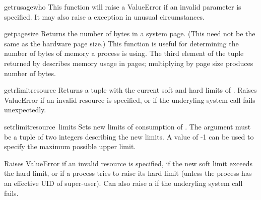 \begin{funcdesc}{getrusage}{who}
  This function will raise a ValueError if an invalid 
  parameter is specified. It may also raise a 
  exception in unusual circumstances.
\end{funcdesc}

\begin{funcdesc}{getpagesize}{}
  Returns the number of bytes in a system page. (This need not be the
  same as the hardware page size.) This function is useful for
  determining the number of bytes of memory a process is using. The
  third element of the tuple returned by  describes
  memory usage in pages; multiplying by page size produces number of
  bytes. 
\end{funcdesc}

\begin{funcdesc}{getrlimit}{resource}
  Returns a tuple  with the current
  soft and hard limits of . Raises ValueError if
  an invalid resource is specified, or  if the
  underyling system call fails unexpectedly.
\end{funcdesc}

\begin{funcdesc}{setrlimit}{resource\, limits}
  Sets new limits of consumption of . The 
  argument must be a tuple  of two
  integers describing the new limits. A value of -1 can be used to
  specify the maximum possible upper limit.

  Raises ValueError if an invalid resource is specified, if the new
  soft limit exceeds the hard limit, or if a process tries to raise its
  hard limit (unless the process has an effective UID of
  super-user). Can also raise a  if the
  underyling system call fails.
\end{funcdesc}
